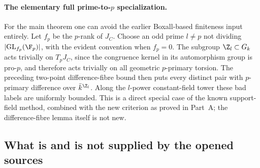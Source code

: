 \paragraph{The elementary full prime-to-$p$ specialization.}
For the main theorem one can avoid the earlier Boxall-based finiteness
input entirely. Let $f_p$ be the $p$-rank of $J_C$. Choose an odd prime
$l\ne p$ not dividing $|\mathrm{GL}_{f_p}(\F_p)|$, with the evident
convention when $f_p=0$. The subgroup $\Z_l\subset G_k$ acts trivially
on $T_pJ_C$, since the congruence kernel in its automorphism group is
pro-$p$, and therefore acts trivially on all geometric $p$-primary
torsion. The preceding two-point difference-fibre bound then puts
every distinct pair with $p$-primary difference over
$\bar k^{\Z_l}$. Along the $l$-power constant-field tower these bad
labels are uniformly bounded. This is a direct special case of the
known support-field method, combined with the new criterion as proved
in Part~A; the difference-fibre lemma itself is not new.

\subsection{What is and is not supplied by the opened sources}

